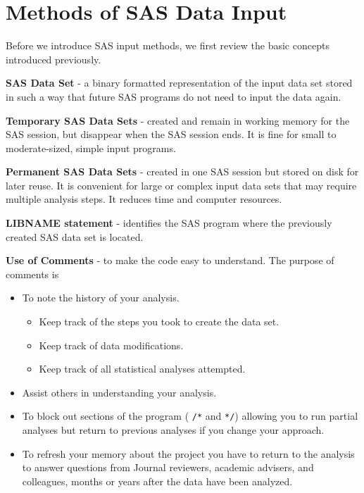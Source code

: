 \documentclass[
]{book}
\providecommand{\tightlist}{%
  \setlength{\itemsep}{0pt}\setlength{\parskip}{0pt}}
\begin{document}
\hypertarget{methods-of-sas-data-input}{%
\chapter{Methods of SAS Data Input}\label{methods-of-sas-data-input}}

Before we introduce SAS input methods, we first review the basic concepts introduced previously.

\textbf{SAS Data Set} - a binary formatted representation of the input data set stored in such a way that future SAS programs do not need to input the data again.

\textbf{Temporary SAS Data Sets} - created and remain in working memory for the SAS session, but disappear when the SAS session ends. It is fine for small to moderate-sized, simple input programs.

\textbf{Permanent SAS Data Sets} - created in one SAS session but stored on disk for later reuse. It is convenient for large or complex input data sets that may require multiple analysis steps. It reduces time and computer resources.

\textbf{LIBNAME statement} - identifies the SAS program where the previously created SAS data set is located.

\textbf{Use of Comments} - to make the code easy to understand. The purpose of comments is

\begin{itemize}
\item
  To note the history of your analysis.

  \begin{itemize}
  \tightlist
  \item
    Keep track of the steps you took to create the data set.
  \item
    Keep track of data modifications.
  \item
    Keep track of all statistical analyses attempted.
  \end{itemize}
\item
  Assist others in understanding your analysis.
\item
  To block out sections of the program ( \texttt{/*} and \texttt{*/}) allowing you to run partial analyses but return to previous analyses if you change your approach.
\item
  To refresh your memory about the project you have to return to the analysis to answer questions from Journal reviewers, academic advisers, and colleagues, months or years after the data have been analyzed.
\end{itemize}
\end{document}
